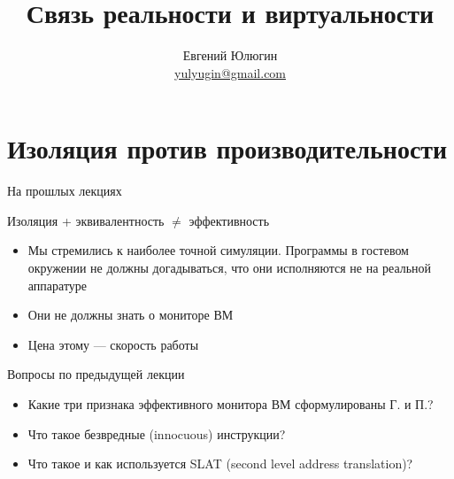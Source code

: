 
\title{Связь реальности и виртуальности}
\author[Евгений Юлюгин]{Евгений Юлюгин \\ \small{\href{mailto:yulyugin@gmail.com}{yulyugin@gmail.com}}}



\begin{frame}
    \maketitle
\end{frame}

\begin{frame}
    \tableofcontents
\end{frame}

\section[Изоляция]{Изоляция против производительности}

\begin{frame}{На прошлых лекциях}

Изоляция + эквивалентность $\neq$ эффективность

\begin{itemize}
\item Мы стремились к наиболее точной симуляции. Программы в гостевом окружении не должны догадываться, что они исполняются не на реальной аппаратуре
\item Они не должны знать о мониторе ВМ
\item Цена этому — скорость работы

\end{itemize}

\end{frame}

\begin{frame}{Вопросы по предыдущей лекции}

\begin{itemize}
\item Какие три признака эффективного монитора ВМ сформулированы Г. и П.?
\item Что такое безвредные (innocuous) инструкции?
\item Что такое и как используется SLAT (second level address translation)?


\end{itemize}

\end{frame}


